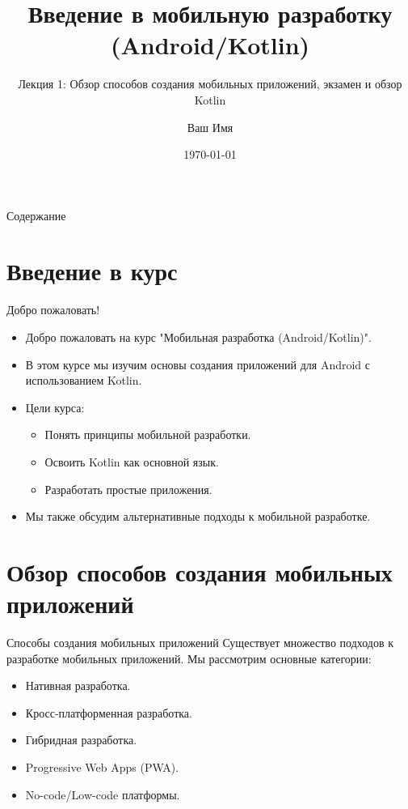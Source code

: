 \documentclass{beamer}
\title{Введение в мобильную разработку (Android/Kotlin)}
\subtitle{Лекция 1: Обзор способов создания мобильных приложений, экзамен и обзор Kotlin}
\author{Ваш Имя}
\institute{Ваш Университет}
\date{\today}
\begin{document}
\begin{frame}
  \titlepage
\end{frame}

\begin{frame}{Содержание}
  \tableofcontents
\end{frame}

\section{Введение в курс}

\begin{frame}{Добро пожаловать!}
  \begin{itemize}
    \item Добро пожаловать на курс "Мобильная разработка (Android/Kotlin)".
    \item В этом курсе мы изучим основы создания приложений для Android с использованием Kotlin.
    \item Цели курса:
      \begin{itemize}
        \item Понять принципы мобильной разработки.
        \item Освоить Kotlin как основной язык.
        \item Разработать простые приложения.
      \end{itemize}
    \item Мы также обсудим альтернативные подходы к мобильной разработке.
  \end{itemize}
\end{frame}

\section{Обзор способов создания мобильных приложений}

\begin{frame}{Способы создания мобильных приложений}
  Существует множество подходов к разработке мобильных приложений. Мы рассмотрим основные категории:
  \begin{itemize}
    \item Нативная разработка.
    \item Кросс-платформенная разработка.
    \item Гибридная разработка.
    \item Progressive Web Apps (PWA).
    \item No-code/Low-code платформы.
  \end{itemize}
\end{frame}
\end{document}
